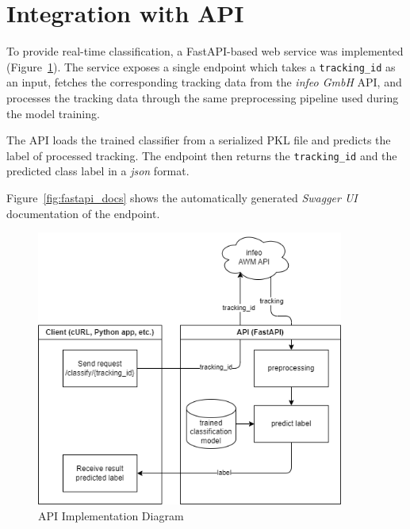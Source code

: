 \documentclass[a4paper,12pt,twoside]{scrreprt}
\begin{document}
\section{Integration with API}

To provide real-time classification, a FastAPI-based web service was
implemented (Figure~\ref{fig:fastapi_implementation_diagram}). The service
exposes a single endpoint which takes a
\texttt{tracking\_id} as an input, fetches the corresponding tracking data from
the \textit{infeo GmbH} API, and processes the tracking data through the same
preprocessing pipeline used during the model training.

The API loads the trained classifier from a serialized PKL file and
predicts the label of processed tracking.
The endpoint then returns the \texttt{tracking\_id} and the predicted class
label in a \textit{json} format.

Figure~\ref{fig:fastapi_docs} shows the automatically generated \textit{Swagger
  UI} documentation of the endpoint.

\begin{figure}[htbp]
  \centering

  \includegraphics[width=0.9\textwidth]{Diagrams/drawio/api/api_implementation.png}
  \caption{API Implementation Diagram}
  \label{fig:fastapi_implementation_diagram}
\end{figure}
\end{document}
